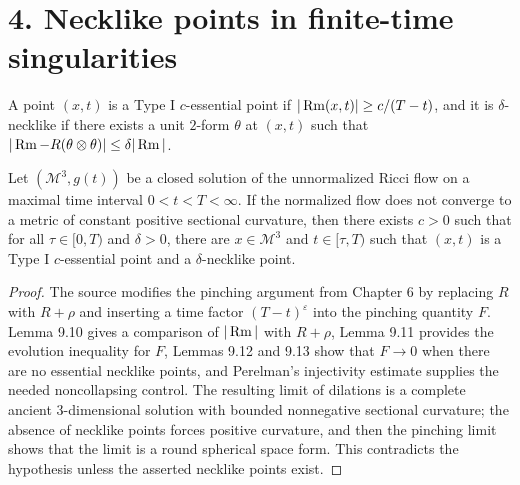\section*{4. Necklike points in finite-time singularities}

\begin{definition}
\label{ch09-def-type-i-essential-necklike}
A point \((x,t)\) is a Type I \(c\)-essential point if \(|\operatorname{Rm}(x,t)|\ge c/(T-t)\), and it is \(\delta\)-necklike if there exists a unit \(2\)-form \(\theta\) at \((x,t)\) such that \(|\operatorname{Rm}-R(\theta\otimes\theta)|\le \delta|\operatorname{Rm}|\).
\end{definition}

\begin{theorem}
\label{ch09-thm-necklike-points-finite-time}
Let \((\mathcal M^3,g(t))\) be a closed solution of the unnormalized Ricci flow on a maximal time interval \(0<t<T<\infty\). If the normalized flow does not converge to a metric of constant positive sectional curvature, then there exists \(c>0\) such that for all \(\tau\in[0,T)\) and \(\delta>0\), there are \(x\in\mathcal M^3\) and \(t\in[\tau,T)\) such that \((x,t)\) is a Type I \(c\)-essential point and a \(\delta\)-necklike point.
\end{theorem}

\begin{proof}
The source modifies the pinching argument from Chapter 6 by replacing \(R\) with \(R+\rho\) and inserting a time factor \((T-t)^\varepsilon\) into the pinching quantity \(F\). Lemma 9.10 gives a comparison of \(|\operatorname{Rm}|\) with \(R+\rho\), Lemma 9.11 provides the evolution inequality for \(F\), Lemmas 9.12 and 9.13 show that \(F\to 0\) when there are no essential necklike points, and Perelman's injectivity estimate supplies the needed noncollapsing control. The resulting limit of dilations is a complete ancient \(3\)-dimensional solution with bounded nonnegative sectional curvature; the absence of necklike points forces positive curvature, and then the pinching limit shows that the limit is a round spherical space form. This contradicts the hypothesis unless the asserted necklike points exist.
\end{proof}

